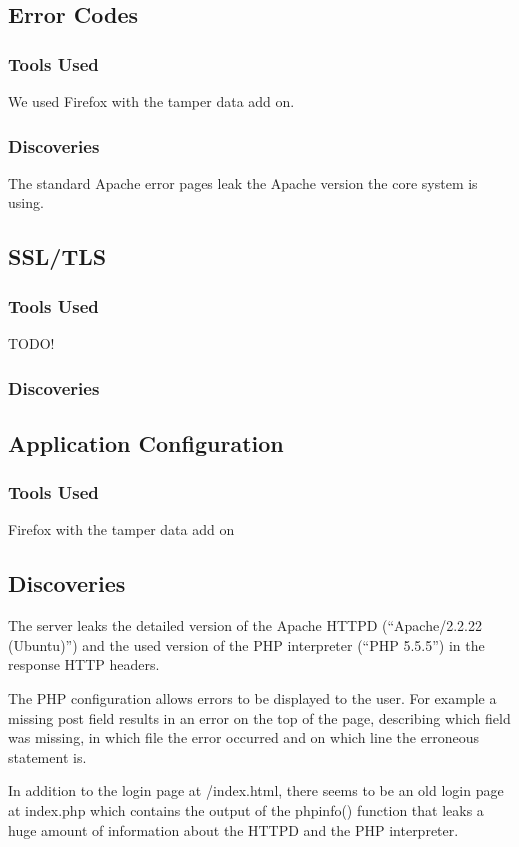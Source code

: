\documentclass{article}
\begin{document}
\subsection{Error Codes}
\subsubsection{Tools Used}
We used Firefox with the tamper data add on.

\subsubsection{Discoveries}
The standard Apache error pages leak the Apache version the core system is using.

\subsection{SSL/TLS}
\subsubsection{Tools Used}
TODO!

\subsubsection{Discoveries}


\subsection{Application Configuration}
\subsubsection{Tools Used}
Firefox with the tamper data add on

\subsection{Discoveries}
The server leaks the detailed version of the Apache HTTPD (``Apache/2.2.22 (Ubuntu)'') and the used version of the PHP interpreter (``PHP 5.5.5'') in the response HTTP headers.

The PHP configuration allows errors to be displayed to the user. For example a missing post field results in an error on the top of the page, describing which field was missing, in which file the error occurred and on which line the erroneous statement is.

In addition to the login page at /index.html, there seems to be an old login page at index.php which contains the output of the phpinfo() function that leaks a huge amount of information about the HTTPD and the PHP interpreter.
\end{document}
